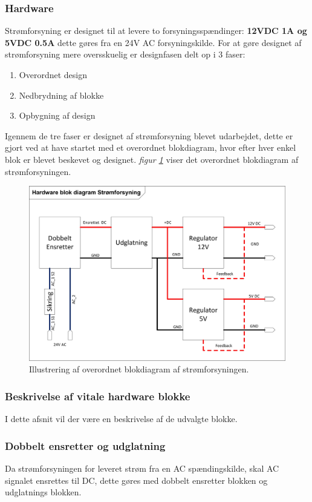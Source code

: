 \subsubsection{Hardware}
Strømforsyning er designet til at levere to forsyningsspændinger: \textbf{12VDC 1A og 5VDC 0.5A} dette gøres fra en 24V AC forsyningskilde. 
For at gøre designet af strømforsyning mere oversskuelig er designfasen delt op i 3 faser:
\begin{enumerate}
\item Overordnet design
\item Nedbrydning af blokke
\item Opbygning af design
\end{enumerate}
Igennem de tre faser er designet af strømforsyning blevet udarbejdet, dette er gjort ved at have startet med et overordnet blokdiagram, hvor efter hver enkel blok er blevet beskevet og designet. \textit{figur \ref{fig:PowerSupplyBlok}} viser det overordnet blokdiagram af strømforsyningen.\\
\begin{figure}[H]
\centering
\includegraphics[scale=1]{billeder/PowerSupplyBlok}
\caption{Illustrering af overordnet blokdiagram af strømforsyningen.}
\label{fig:PowerSupplyBlok}
\end{figure}
\subsubsection{Beskrivelse af vitale hardware blokke}
I dette afsnit vil der være en beskrivelse af de udvalgte blokke.
\subsubsection{Dobbelt ensretter og udglatning}
Da strømforsyningen for leveret strøm fra en AC spændingskilde, skal AC signalet ensrettes til DC, dette gøres med dobbelt ensretter blokken og udglatnings blokken. 
